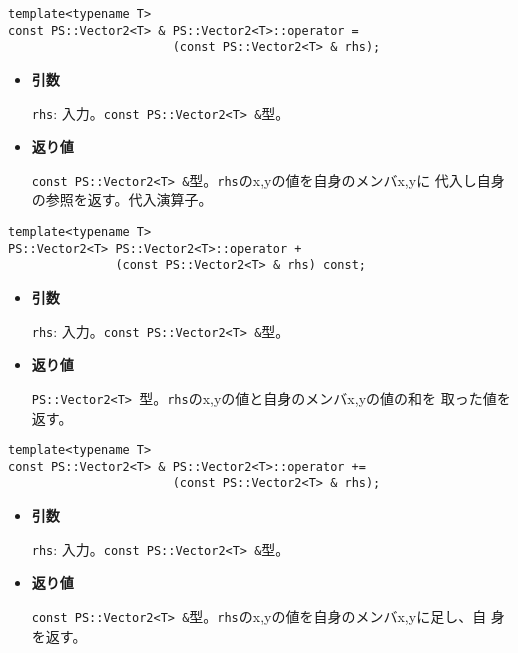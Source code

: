 
\begin{screen}
\begin{verbatim}
template<typename T>
const PS::Vector2<T> & PS::Vector2<T>::operator = 
                       (const PS::Vector2<T> & rhs);
\end{verbatim}
\end{screen}

\begin{itemize}

\item{{\bf 引数}}

{\tt rhs}: 入力。{\tt const PS::Vector2<T> \&}型。

\item{{\bf 返り値}}

{\tt const PS::Vector2<T> \&}型。{\tt rhs}のx,yの値を自身のメンバx,yに
代入し自身の参照を返す。代入演算子。

\end{itemize}


\begin{screen}
\begin{verbatim}
template<typename T>
PS::Vector2<T> PS::Vector2<T>::operator + 
               (const PS::Vector2<T> & rhs) const;
\end{verbatim}
\end{screen}

\begin{itemize}

\item{{\bf 引数}}

{\tt rhs}: 入力。{\tt const PS::Vector2<T> \&}型。

\item{{\bf 返り値}}

{\tt PS::Vector2<T> }型。{\tt rhs}のx,yの値と自身のメンバx,yの値の和を
取った値を返す。

\end{itemize}

\begin{screen}
\begin{verbatim}
template<typename T>
const PS::Vector2<T> & PS::Vector2<T>::operator += 
                       (const PS::Vector2<T> & rhs);
\end{verbatim}
\end{screen}

\begin{itemize}

\item{{\bf 引数}}

{\tt rhs}: 入力。{\tt const PS::Vector2<T> \&}型。

\item{{\bf 返り値}}

{\tt const PS::Vector2<T> \&}型。{\tt rhs}のx,yの値を自身のメンバx,yに足し、自
身を返す。

\end{itemize}


